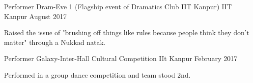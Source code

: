 \begin{cventries}
  \cventry
    {Performer}
    {Dram-Eve 1 (Flagship event of Dramatics Club IIT Kanpur)}
    {IIT Kanpur}
    {August 2017}
    {
      \begin{cvitems}
        \item {Raised the issue of "brushing off things like rules because people think they don't matter" through a Nukkad natak.}
      \end{cvitems}
    }
  \cventry
    {Performer}
    {Galaxy-Inter-Hall Cultural Competition}
    {IIt Kanpur}
    {February 2017}
    {
      \begin{cvitems}
        \item {Performed in a group dance competition and team stood 2nd.}
      \end{cvitems}
    }
\end{cventries}
